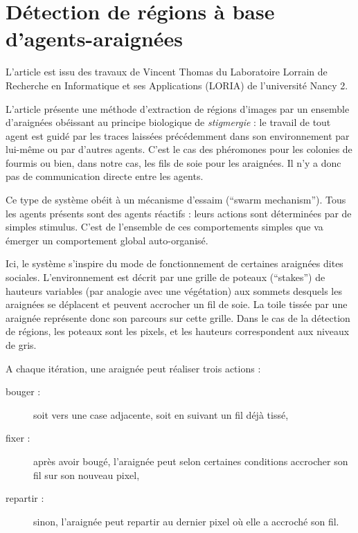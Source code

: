 \section{Détection de régions à base d'agents-araignées}


L'article \cite{spiders} est issu des travaux de Vincent Thomas du Laboratoire Lorrain de Recherche en Informatique et ses Applications (LORIA) de l'université Nancy 2.

L'article présente une méthode d'extraction de régions d'images par un ensemble d'araignées obéissant au principe biologique de \emph{stigmergie} : le travail de tout agent est guidé par les traces laissées précédemment dans son environnement par lui-même ou par d'autres agents. C'est le cas des phéromones pour les colonies de fourmis ou bien, dans notre cas, les fils de soie pour les araignées. Il n'y a donc pas de communication directe entre les agents.

Ce type de système obéit à un \og{} mécanisme d'essaim \fg{} (``swarm mechanism''). Tous les agents présents sont des agents réactifs : leurs actions sont déterminées par de simples stimulus. C'est de l'ensemble de ces comportements simples que va émerger un comportement global auto-organisé.
 
Ici, le système s'inspire du mode de fonctionnement de certaines araignées dites sociales. L'environnement est décrit par une grille de poteaux (``stakes'') de hauteurs variables (par analogie avec une végétation) aux sommets desquels les araignées se déplacent et peuvent accrocher un fil de soie. La toile tissée par une araignée représente donc son parcours sur cette grille.
Dans le cas de la détection de régions, les poteaux sont les pixels, et les hauteurs correspondent aux niveaux de gris.

A chaque itération, une araignée peut réaliser trois actions :
\begin{description}
  \item[bouger :] soit vers une case adjacente, soit en suivant un fil déjà tissé,
  \item[fixer :] après avoir bougé, l'araignée peut selon certaines conditions accrocher son fil sur son nouveau pixel,
  \item[repartir :] sinon, l'araignée peut repartir au dernier pixel où elle a accroché son fil.
\end{description}

